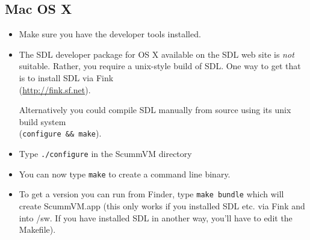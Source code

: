 \subsection{Mac OS X}
\begin{itemize}
\item Make sure you have the developer tools installed.
\item The SDL developer package for OS X available on the SDL web site is
      \textit{not} suitable. Rather, you require a unix-style build of SDL. One
      way to get that is to install SDL via Fink\\
      (\url{http://fink.sf.net}).
      
      Alternatively you could compile SDL manually from source using its
      unix build system\\
      (\texttt{configure \&\& make}).
\item Type \texttt{./configure} in the ScummVM directory
\item You can now type \texttt{make} to create a command line binary.
\item To get a version you can run from Finder, type \texttt{make bundle} which
      will create ScummVM.app (this only works if you installed SDL
      etc. via Fink and into /sw. If you have installed SDL in another
      way, you'll have to edit the Makefile).
\end{itemize}


